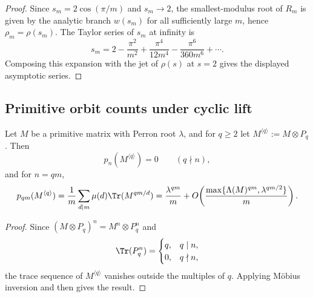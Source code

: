 \begin{proof}
Since \(s_m=2\cos(\pi/m)\) and \(s_m\to 2\), the smallest-modulus root
of \(R_m\) is given by the analytic branch \(w(s_m)\) for all
sufficiently large \(m\), hence \(\rho_m=\rho(s_m)\). The Taylor series
of \(s_m\) at infinity is
\[
  s_m=2-\frac{\pi^2}{m^2}+\frac{\pi^4}{12m^4}-\frac{\pi^6}{360m^6}+\cdots.
\]
Composing this expansion with the jet of \(\rho(s)\) at \(s=2\) gives
the displayed asymptotic series.
\end{proof}

\subsection{Primitive orbit counts under cyclic lift}

\begin{proposition}
  \label{prop:cyclic-lift-primitive-asymptotics}
  Let \(M\) be a primitive matrix with Perron root \(\lambda\), and for
  \(q\ge 2\) let \(M^{\langle q\rangle}:=M\otimes P_q\). Then
  \[
    p_n(M^{\langle q\rangle})=0
    \qquad (q\nmid n),
  \]
  and for \(n=qm\),
  \[
    p_{qm}(M^{\langle q\rangle})
    =\frac{1}{m}\sum_{d\mid m}\mu(d)\Tr(M^{qm/d})
    =\frac{\lambda^{qm}}{m}
      +O\!\left(
        \frac{\max\{\Lambda(M)^{qm},\lambda^{qm/2}\}}{m}
      \right).
  \]
\end{proposition}

\begin{proof}
Since \((M\otimes P_q)^n=M^n\otimes P_q^n\) and
\[
  \Tr(P_q^n)=
  \begin{cases}
    q, & q\mid n,\\
    0, & q\nmid n,
  \end{cases}
\]
the trace sequence of \(M^{\langle q\rangle}\) vanishes outside the
multiples of \(q\). Applying M\"obius inversion and then
 gives the result.
\end{proof}
